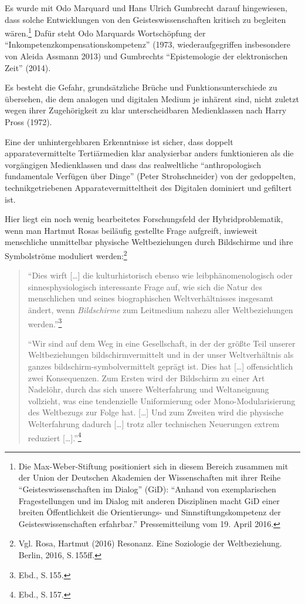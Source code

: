\documentclass[a4paper,
fontsize=11pt,
oneside,
numbers=noperiodatend,
parskip=half-,
bibliography=totoc,
final
]{scrartcl}
\begin{document}
Es wurde mit Odo Marquard und Hans Ulrich Gumbrecht darauf hingewiesen,
dass solche Entwicklungen von den Geisteswissenschaften kritisch zu
begleiten wären.\footnote{Die Max-Weber-Stiftung positioniert sich in
  diesem Bereich zusammen mit der Union der Deutschen Akademien der
  Wissenschaften mit ihrer Reihe \enquote{Geisteswissenschaften im
  Dialog} (GiD): \enquote{Anhand von exemplarischen Fragestellungen und
  im Dialog mit anderen Disziplinen macht GiD einer breiten
  Öffentlichkeit die Orientierungs- und Sinnstiftungskompetenz der
  Geisteswissenschaften erfahrbar.} Pressemitteilung vom 19. April 2016.}
Dafür steht Odo Marquards Wortschöpfung der
\enquote{Inkompetenzkompensationskompetenz} (1973, wiederaufgegriffen
insbesondere von Aleida Assmann 2013) und Gumbrechts
\enquote{Epistemologie der elektronischen Zeit} (2014).

Es besteht die Gefahr, grundsätzliche Brüche und Funktionsunterschiede
zu übersehen, die dem analogen und digitalen Medium je inhärent sind,
nicht zuletzt wegen ihrer Zugehörigkeit zu klar unterscheidbaren
Medienklassen nach Harry Pross (1972).

Eine der unhintergehbaren Erkenntnisse ist sicher, dass doppelt
apparatevermittelte Tertiärmedien klar analysierbar anders funktionieren
als die vorgängigen Medienklassen und dass das realweltliche
\enquote{anthropologisch fundamentale Verfügen über Dinge} (Peter
Strohschneider) von der gedoppelten, technikgetriebenen
Apparatevermitteltheit des Digitalen dominiert und gefiltert ist.

Hier liegt ein noch wenig bearbeitetes Forschungsfeld der
Hybridproblematik, wenn man Hartmut Rosas beiläufig gestellte Frage
aufgreift, inwieweit menschliche unmittelbar physische Weltbeziehungen
durch Bildschirme und ihre Symbolströme moduliert werden:\footnote{Vgl.
  Rosa, Hartmut (2016) Resonanz. Eine Soziologie der Weltbeziehung.
  Berlin, 2016, S.\,155ff.}

\begin{quote}
\enquote{Dies wirft {[}\ldots{}{]} die kulturhistorisch ebenso wie
leibphänomenologisch oder sinnesphysiologisch interessante Frage auf,
wie sich die Natur des menschlichen und seines biographischen
Weltverhältnisses insgesamt ändert, wenn \emph{Bildschirme} zum
Leitmedium nahezu aller Weltbeziehungen werden.}\footnote{Ebd., S.\,155.}

\enquote{Wir sind auf dem Weg in eine Gesellschaft, in der der größte
Teil unserer Weltbeziehungen bildschirmvermittelt und in der unser
Weltverhältnis als ganzes bildschirm-symbolvermittelt geprägt ist. Dies
hat {[}\ldots{}{]} offensichtlich zwei Konsequenzen. Zum Ersten wird der
Bildschirm zu einer Art Nadelöhr, durch das sich unsere Welterfahrung
und Weltaneignung vollzieht, was eine tendenzielle Uniformierung oder
Mono-Modularisierung des Weltbezugs zur Folge hat. {[}\ldots{}{]} Und
zum Zweiten wird die physische Welterfahrung dadurch {[}\ldots{}{]}
trotz aller technischen Neuerungen extrem reduziert
{[}\ldots{}{]}.}\footnote{Ebd., S.\,157.}
\end{quote}
\end{document}
